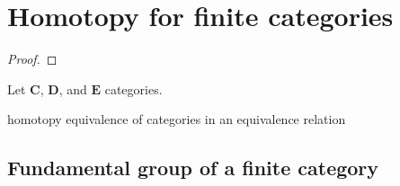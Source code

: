 \chapter{Homotopy for finite categories}

\begin{definition}
    
\end{definition}

\begin{definition}[Homotopy]
    
\end{definition}

\begin{theorem}
    
\end{theorem}

\begin{proof}
    
\end{proof}

\begin{definition}
    
\end{definition}

\begin{lemma}
    Let \(\mathbf{C}\), \(\mathbf{D}\), and \(\mathbf{E} \) categories.
\end{lemma}


\begin{definition}
    
\end{definition}

\begin{theorem}
    homotopy equivalence of categories in an equivalence relation
\end{theorem}


\section{Fundamental group of a finite category}

